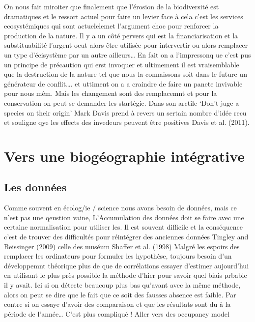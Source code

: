 On nous fait miroiter que finalement que l'érosion de la biodiversité
est dramatiques et le ressort actuel pour faire un levier face à cela
c'est les services ecosystémiques qui sont actuelelemet l'argument choc
pour renforcer la production de la nature. Il y a un côté pervers qui
est la financiarisation et la substituabilité l'argent oeut alors être
utilisée pour intervertir ou alors remplacer un type d'écisystème par un
autre ailleurs\ldots{} En fait on a l'impressonq ue c'est pus un
principe de précaution qui erst invoquer et ultimement il est
vraisemblable que la destruction de la nature tel que nous la
connaissons soit dans le future un générateur de conflit\ldots{}. et
uttiment on a a craindre de faire un panete invivable pour nous mêm.
Mais les changement sont des remplacemnt et pour la conservation on peut
se demander les startégie. Dans son arctile `Don't juge a species on
their origin' Mark Davis prend à revers un sertain nombre d'idée recu et
souligne qye les effects des invedeurs peuvent être positives Davis et
al. (2011).

\section*{Vers une biogéographie
intégrative}\label{vers-une-bioguxe9ographie-intuxe9grative}

\subsection{Les données}\label{les-donnuxe9es}

Comme souvent en écolog/ie / science nous avons besoin de données, mais
ce n'est pas une qeustion vaine, L'Accumulation des données doit se
faire avec une certaine normalisation pour utiliser les. Il est souvent
difficile et la conséquence c'est de trouver des difficultés pour
réintégrer des anciennes données Tingley and Beissinger (2009) celle des
muséum Shaffer et al. (1998) Malgré les espoirs des remplacer les
ordinateurs pour formuler les hypothèse, toujours besoin d'un
développemnt théorique plus de que de corrélations essayer d'estimer
aujourd'hui en utilisant le plus près possible la méthode d'hier pour
savoir quel biais prbable il y avait. Ici si on détecte beaucoup plus
bas qu'avant avec la même méthode, alors on peut se dire que le fait que
ce soit des fausses absence est faible. Par contre si on essaye d'avoir
des comparaison et que les résultats sont du à la période de
l'année\ldots{} C'est plus compliqué ! Aller vers des occupancy model

